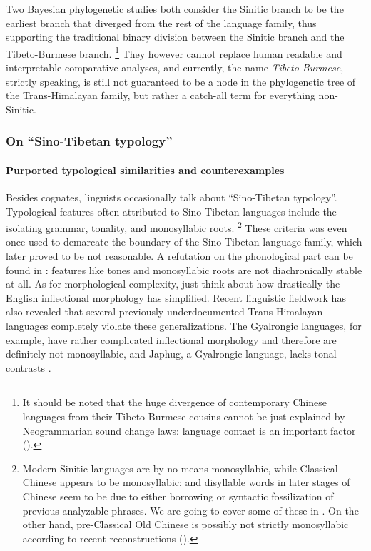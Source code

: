 \documentclass[UTF8, a4paper, oneside, scheme=plain, 12pt]{ctexrep}
\newcommand*{\term}[1]{\emph{#1}}
\begin{document}
Two Bayesian phylogenetic studies \citep{sagart2019dated,zhang2019phylogenetic} 
both consider the Sinitic branch to be the earliest branch that diverged from the rest of the language family,
thus supporting the traditional binary division between the Sinitic branch
and the Tibeto-Burmese branch.%
\footnote{
    It should be noted that the huge divergence of contemporary Chinese languages
    from their Tibeto-Burmese cousins 
    cannot be just explained by Neogrammarian sound change laws:
    language contact is an important factor ().
}
They however cannot replace human readable and interpretable comparative analyses,
and currently, the name \term{Tibeto-Burmese}, strictly speaking,
is still not guaranteed to be a node in the phylogenetic tree of the Trans-Himalayan family,
but rather a catch-all term for everything non-Sinitic.

\subsubsection{On ``Sino-Tibetan typology''}\label{sec:intro.sino-tibetan-typology}

\paragraph*{Purported typological similarities and counterexamples}
Besides cognates, linguists occasionally talk about ``Sino-Tibetan typology''.
Typological features often attributed to Sino-Tibetan languages include the isolating grammar,
tonality, and monosyllabic roots.%
\footnote{
    Modern Sinitic languages are by no means monosyllabic,
    while Classical Chinese appears to be monosyllabic:
    and disyllable words in later stages of Chinese seem to be due to 
    either borrowing or syntactic fossilization of previous analyzable phrases.
    We are going to cover some of these in .
    On the other hand, pre-Classical Old Chinese is possibly not strictly monosyllabic
    according to recent reconstructions ().
}
These criteria was even once used to demarcate the boundary of the Sino-Tibetan language family,
which later proved to be not reasonable.
A refutation on the phonological part can be found in \citet{matisoff1973notes}:
features like tones and monosyllabic roots are not diachronically stable at all. 
As for morphological complexity, just think about how drastically the English inflectional morphology has simplified.
Recent linguistic fieldwork has also revealed that several previously underdocumented Trans-Himalayan languages
completely violate these generalizations.
The Gyalrongic languages, for example, have rather complicated inflectional morphology
and therefore are definitely not monosyllabic,
and Japhug, a Gyalrongic language, lacks tonal contrasts \citep{jacques2021grammar}.
\end{document}
